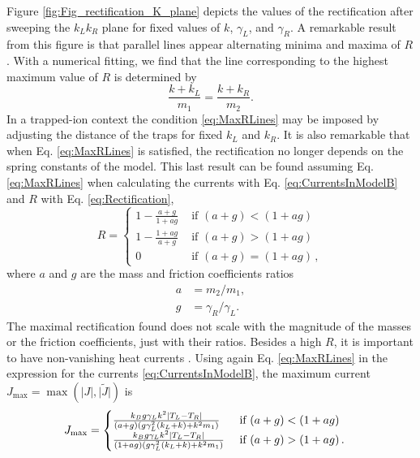Figure \ref{fig:Fig_rectification_K_plane} depicts the values of the rectification after sweeping the $k_L k_R$ plane for fixed values of $k$, $\gamma_L$, and $\gamma_R$. A remarkable result from this figure is that parallel lines appear alternating minima and maxima of $R$. With a numerical fitting, we find that the line corresponding to the highest maximum value of $R$ is determined by
%
\begin{equation}
  \frac{k+k_L}{m_1} = \frac{k+k_R}{m_2}.
  \label{eq:MaxRLines}
\end{equation}
%
In a trapped-ion context the condition \eqref{eq:MaxRLines} may be imposed by adjusting the distance of the traps for fixed $k_L$ and $k_R$. It is also  remarkable that when Eq. \eqref{eq:MaxRLines} is satisfied, the rectification no longer depends on the spring constants of the model. This last result can be  found assuming  Eq. \eqref{eq:MaxRLines} when calculating the currents with Eq. \eqref{eq:CurrentsInModelB} and $R$ with Eq. \eqref{eq:Rectification},
%
\begin{equation}
    R=
    \begin{cases}
      1-\frac{a+g}{1+ag} &\text{ if }(a+g)<(1+ag)\\
      1-\frac{1+ag}{a+g} &\text{ if }(a+g)>(1+ag)\\
      0 &\text{ if } (a+g)=(1+ag)\,,
    \end{cases}
  \label{eq:maxRExpression}
\end{equation}
%
where $a$ and $g$ are the mass and friction coefficients ratios
%
\begin{align}
  a &= m_2/m_1,\nonumber\\
  g &= \gamma_R/\gamma_L.
\end{align}
%
The maximal rectification found does not scale with the magnitude of the masses or the friction coefficients, just with their ratios. Besides a high $R$, it is important to have non-vanishing heat currents
\cite{Simon2019}. Using again  Eq. \eqref{eq:MaxRLines} in the expression for the currents \eqref{eq:CurrentsInModelB}, the maximum current $J_{\max} = \max(\big|{J}\big|,\big|\tilde{J}\big|)$ is
%
\begin{align}
    &J_{\max}=\begin{cases}
   \frac{k_B g\gamma_L k^2 \abs{T_L-T_R}}{(a+g)(g\gamma_L^2(k_L+k)+k^2m_1)} & \text{ if }(a+g)<(1+ag)
    \\
    \frac{k_B g\gamma_L k^2 \abs{T_L-T_R}}{(1+ag)(g\gamma_L^2(k_L+k)+k^2m_1)}& \text{ if }(a+g)>(1+ag)\,.
    \end{cases}
    \label{eq:maxJExpression}
\end{align}
